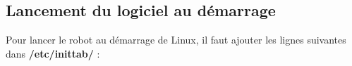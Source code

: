 \subsection{Lancement du logiciel au démarrage}
Pour lancer le robot au démarrage de Linux, il faut ajouter les lignes suivantes dans \textbf{/etc/inittab/} :
\\




